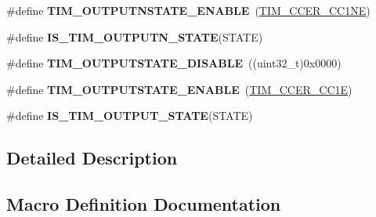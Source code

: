 \begin{DoxyCompactItemize}
\item 
\#define {\bfseries T\+I\+M\+\_\+\+O\+U\+T\+P\+U\+T\+N\+S\+T\+A\+T\+E\+\_\+\+E\+N\+A\+B\+LE}~(\hyperlink{group___peripheral___registers___bits___definition_ga813056b3f90a13c4432aeba55f28957e}{T\+I\+M\+\_\+\+C\+C\+E\+R\+\_\+\+C\+C1\+NE})\hypertarget{group___h_a_l___t_i_m___aliased___macros_ga3323d8c81a7f3940aa290d160dea3e0d}{}\label{group___h_a_l___t_i_m___aliased___macros_ga3323d8c81a7f3940aa290d160dea3e0d}

\item 
\#define {\bfseries I\+S\+\_\+\+T\+I\+M\+\_\+\+O\+U\+T\+P\+U\+T\+N\+\_\+\+S\+T\+A\+TE}(S\+T\+A\+TE)
\item 
\#define {\bfseries T\+I\+M\+\_\+\+O\+U\+T\+P\+U\+T\+S\+T\+A\+T\+E\+\_\+\+D\+I\+S\+A\+B\+LE}~((uint32\+\_\+t)0x0000)\hypertarget{group___h_a_l___t_i_m___aliased___macros_ga98fa585adffeb0d3654b47040576c6b7}{}\label{group___h_a_l___t_i_m___aliased___macros_ga98fa585adffeb0d3654b47040576c6b7}

\item 
\#define {\bfseries T\+I\+M\+\_\+\+O\+U\+T\+P\+U\+T\+S\+T\+A\+T\+E\+\_\+\+E\+N\+A\+B\+LE}~(\hyperlink{group___peripheral___registers___bits___definition_ga3f494b9881e7b97bb2d79f7ad4e79937}{T\+I\+M\+\_\+\+C\+C\+E\+R\+\_\+\+C\+C1E})\hypertarget{group___h_a_l___t_i_m___aliased___macros_ga114555abc521311f689478a7e0a9ace9}{}\label{group___h_a_l___t_i_m___aliased___macros_ga114555abc521311f689478a7e0a9ace9}

\item 
\#define {\bfseries I\+S\+\_\+\+T\+I\+M\+\_\+\+O\+U\+T\+P\+U\+T\+\_\+\+S\+T\+A\+TE}(S\+T\+A\+TE)
\end{DoxyCompactItemize}


\subsection{Detailed Description}


\subsection{Macro Definition Documentation}
